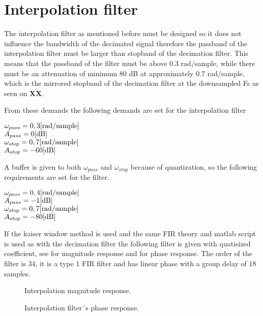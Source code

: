 \section{Interpolation filter} \label{sec:IntFilter}
The interpolation filter as mentioned before must be designed so it does not influence the bandwidth of the decimated signal therefore the passband of the interpolation filter must be larger than stopband of the decimation filter. This means that the passband of the filter must be above 0.3 rad/sample, while there must be an attenuation of minimum 80 dB at approximately 0.7 rad/sample, which is the mirrored stopband of the decimation filter at the downsampled Fs as seen on \textbf{XX}. 


From these demands the following demands are set for the interpolation filter

$\omega_{pass}=0,3 \enhed{rad/sample}$\\
$A_{pass}=0 \enhed{dB}$\\
$\omega_{stop}=0,7 \enhed{rad/sample}$\\
$A_{stop}=-60 \enhed{dB}$

A buffer is given to both $\omega_{pass}$ and $\omega_{stop}$ because of quantization, so the following requirements are set for the filter.

$\omega_{pass}=0,4 \enhed{rad/sample}$\\
$A_{pass}=-1 \enhed{dB}$\\
$\omega_{stop}=0,7 \enhed{rad/sample}$\\
$A_{stop}=-80 \enhed{dB}$

 If the kaiser window method is used and the same FIR theory and matlab script is used as with the decimation filter the following filter is given with quatisized coefficient, see for magnitude response and for phase response. The order of the filter is 34, it is a type 1 FIR filter and has linear phase with a group delay of 18 samples.

\begin{figure}[H]
	\centering
	
	\caption{Interpolation magnitude response.}
	\label{fig:IntMag}
\end{figure}

\begin{figure}[H]
	\centering
	
	\caption{Interpolation filter´s phase response.}
	\label{fig:IntPhase}
\end{figure}

